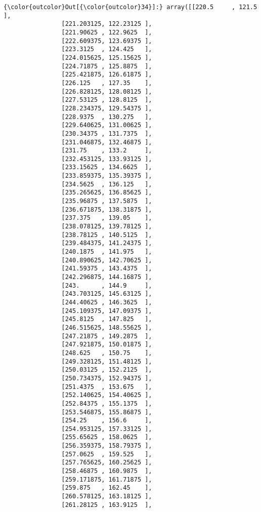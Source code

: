 \documentclass[11pt]{article}
\begin{document}
\begin{Verbatim}[commandchars=\\\{\}]
{\color{outcolor}Out[{\color{outcolor}34}]:} array([[220.5     , 121.5     ],
                [221.203125, 122.23125 ],
                [221.90625 , 122.9625  ],
                [222.609375, 123.69375 ],
                [223.3125  , 124.425   ],
                [224.015625, 125.15625 ],
                [224.71875 , 125.8875  ],
                [225.421875, 126.61875 ],
                [226.125   , 127.35    ],
                [226.828125, 128.08125 ],
                [227.53125 , 128.8125  ],
                [228.234375, 129.54375 ],
                [228.9375  , 130.275   ],
                [229.640625, 131.00625 ],
                [230.34375 , 131.7375  ],
                [231.046875, 132.46875 ],
                [231.75    , 133.2     ],
                [232.453125, 133.93125 ],
                [233.15625 , 134.6625  ],
                [233.859375, 135.39375 ],
                [234.5625  , 136.125   ],
                [235.265625, 136.85625 ],
                [235.96875 , 137.5875  ],
                [236.671875, 138.31875 ],
                [237.375   , 139.05    ],
                [238.078125, 139.78125 ],
                [238.78125 , 140.5125  ],
                [239.484375, 141.24375 ],
                [240.1875  , 141.975   ],
                [240.890625, 142.70625 ],
                [241.59375 , 143.4375  ],
                [242.296875, 144.16875 ],
                [243.      , 144.9     ],
                [243.703125, 145.63125 ],
                [244.40625 , 146.3625  ],
                [245.109375, 147.09375 ],
                [245.8125  , 147.825   ],
                [246.515625, 148.55625 ],
                [247.21875 , 149.2875  ],
                [247.921875, 150.01875 ],
                [248.625   , 150.75    ],
                [249.328125, 151.48125 ],
                [250.03125 , 152.2125  ],
                [250.734375, 152.94375 ],
                [251.4375  , 153.675   ],
                [252.140625, 154.40625 ],
                [252.84375 , 155.1375  ],
                [253.546875, 155.86875 ],
                [254.25    , 156.6     ],
                [254.953125, 157.33125 ],
                [255.65625 , 158.0625  ],
                [256.359375, 158.79375 ],
                [257.0625  , 159.525   ],
                [257.765625, 160.25625 ],
                [258.46875 , 160.9875  ],
                [259.171875, 161.71875 ],
                [259.875   , 162.45    ],
                [260.578125, 163.18125 ],
                [261.28125 , 163.9125  ],

\end{Verbatim}
\end{document}
